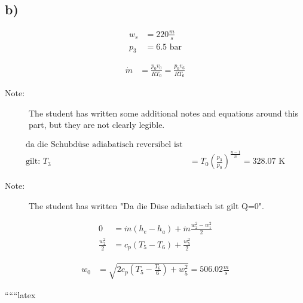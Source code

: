 

\subsection*{b)}

\begin{align*}
    w_s &= 220 \frac{m}{s} \\
    p_3 &= 6.5 \text{ bar}
\end{align*}

\begin{align*}
    \dot{m} &= \frac{p_0 v_0}{R T_0} = \frac{p_0 v_6}{R T_6}
\end{align*}

\begin{description}
    \item[Note:] The student has written some additional notes and equations around this part, but they are not clearly legible.
\end{description}

\begin{align*}
    \text{da die Schubdüse adiabatisch reversibel ist} \\
    \text{gilt: } T_3 &= T_0 \left( \frac{p_3}{p_0} \right)^{\frac{n-1}{n}} = 328.07 \text{ K}
\end{align*}

\begin{description}
    \item[Note:] The student has written "Da die Düse adiabatisch ist gilt Q=0".
\end{description}

\begin{align*}
    0 &= \dot{m} (h_e - h_a) + \dot{m} \frac{w_2^2 - w_1^2}{2} \\
    \frac{w_2^2}{2} &= c_p (T_5 - T_6) + \frac{w_5^2}{2}
\end{align*}

\begin{align*}
    w_0 &= \sqrt{2 c_p (T_5 - \frac{T_6}{6}) + w_5^2} = 506.02 \frac{m}{s}
\end{align*}

``````latex